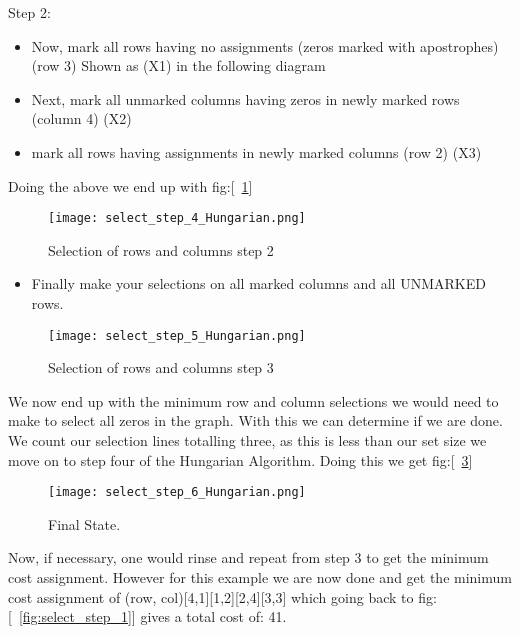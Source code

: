\newpage	
Step 2:
\begin{itemize}
 \item Now, mark all rows having no assignments (zeros marked with apostrophes) (row 3) Shown as (X1) in the following diagram
 \item Next, mark all unmarked columns having zeros in newly marked rows (column 4) (X2)
 \item mark all rows having assignments in newly marked columns (row 2) (X3)
\end{itemize}

Doing the above we end up with fig:[~\ref{fig:select_step_4}] 

  	\begin{figure}[H]
		\centering
		\caption{Selection of rows and columns step 2 \label{fig:select_step_4}}
		\texttt{[image: select\_step\_4\_Hungarian.png]}
	\end{figure}

\begin{itemize}	
 \item Finally make your selections on all marked columns and all UNMARKED rows.  
\end{itemize}

  	\begin{figure}[H]
		\centering
		\caption{Selection of rows and columns step 3 \label{fig:select_step_5}}
		\texttt{[image: select\_step\_5\_Hungarian.png]}
	\end{figure}
	
We now end up with the minimum row and column selections we would need to make to select all zeros 
in the graph.  With this we can determine if we are done.  We count our selection lines totalling 
three, as this is less than our set size we move on to step four of the Hungarian Algorithm.  Doing 
this we get fig:[~\ref{fig:select_step_6}] 
	
  	\begin{figure}[H]
		\centering
		\caption{Final State.\label{fig:select_step_6}}
		\texttt{[image: select\_step\_6\_Hungarian.png]}
	\end{figure}

Now, if necessary, one would rinse and repeat from step 3 to get the minimum cost assignment.  However 
for this example we are now done and get the minimum cost assignment of (row, col)[4,1][1,2][2,4][3,3] 
which going back to fig:[~\ref{fig:select_step_1}] gives a total cost of: 41.  \\

